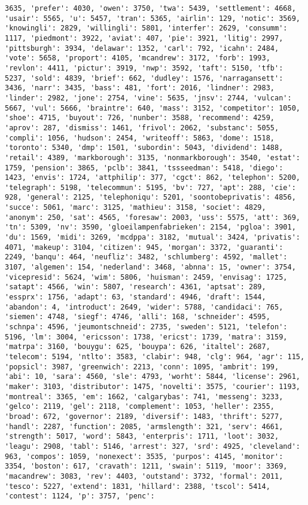 \documentclass[11pt]{article}
\begin{document}
\begin{Verbatim}[commandchars=\\\{\}]
3635, 'prefer': 4030, 'owen': 3750, 'twa': 5439, 'settlement': 4668, 'usair': 5565, 'u': 5457, 'tran': 5365, 'airlin': 129, 'notic': 3569, 'knowingli': 2829, 'willingli': 5801, 'interfer': 2629, 'consumm': 1117, 'piedmont': 3922, 'aviat': 407, 'pie': 3921, 'litig': 2997, 'pittsburgh': 3934, 'delawar': 1352, 'carl': 792, 'icahn': 2484, 'vote': 5658, 'proport': 4105, 'mcandrew': 3172, 'forb': 1993, 'revlon': 4411, 'pictur': 3919, 'nwp': 3592, 'taft': 5150, 'tfb': 5237, 'sold': 4839, 'brief': 662, 'dudley': 1576, 'narragansett': 3436, 'narr': 3435, 'bass': 481, 'fort': 2016, 'lindner': 2983, 'linder': 2982, 'jone': 2754, 'vine': 5635, 'jnsv': 2744, 'vulcan': 5667, 'vul': 5666, 'braintre': 640, 'mass': 3152, 'competitor': 1050, 'shoe': 4715, 'buyout': 726, 'nunber': 3588, 'recommend': 4259, 'aprov': 287, 'dismiss': 1461, 'frivol': 2062, 'substanc': 5055, 'compli': 1056, 'hudson': 2454, 'writeoff': 5863, 'dome': 1518, 'toronto': 5340, 'dmp': 1501, 'subordin': 5043, 'dividend': 1488, 'retail': 4389, 'markborough': 3135, 'nonmarkborough': 3540, 'estat': 1759, 'pension': 3865, 'pclb': 3841, 'tssseedman': 5418, 'diego': 1423, 'envis': 1724, 'attphilip': 377, 'cgct': 862, 'telephon': 5200, 'telegraph': 5198, 'telecommun': 5195, 'bv': 727, 'apt': 288, 'cie': 928, 'general': 2125, 'telephoniqu': 5201, 'soontobeprivatis': 4856, 'succe': 5061, 'marc': 3125, 'mathieu': 3158, 'societ': 4829, 'anonym': 250, 'sat': 4565, 'foresaw': 2003, 'uss': 5575, 'att': 369, 'tn': 5309, 'nv': 3590, 'gloeilampenfabrieken': 2154, 'pgloa': 3901, 'du': 1569, 'midi': 3269, 'mcdppa': 3182, 'mutual': 3424, 'privatis': 4071, 'makeup': 3104, 'citizen': 945, 'morgan': 3372, 'guaranti': 2249, 'banqu': 464, 'neufliz': 3482, 'schlumberg': 4592, 'mallet': 3107, 'algemen': 154, 'nederland': 3468, 'abnna': 15, 'owner': 3754, 'vicepresid': 5624, 'wim': 5806, 'huisman': 2459, 'envisag': 1725, 'satapt': 4566, 'win': 5807, 'research': 4361, 'aptsat': 289, 'essprx': 1756, 'adapt': 63, 'standard': 4946, 'draft': 1544, 'abandon': 4, 'introduct': 2649, 'wider': 5788, 'candidaci': 765, 'siemen': 4748, 'siegf': 4746, 'alli': 168, 'schneider': 4595, 'schnpa': 4596, 'jeumontschneid': 2735, 'sweden': 5121, 'telefon': 5196, 'lm': 3004, 'ericsson': 1738, 'ericst': 1739, 'matra': 3159, 'matrpa': 3160, 'bouygu': 625, 'bouypa': 626, 'italtel': 2687, 'telecom': 5194, 'ntlto': 3583, 'clabir': 948, 'clg': 964, 'agr': 115, 'popsicl': 3987, 'greenwich': 2213, 'conn': 1095, 'ambrit': 199, 'abi': 10, 'sara': 4560, 'sle': 4793, 'worht': 5844, 'license': 2961, 'maker': 3103, 'distributor': 1475, 'novelti': 3575, 'courier': 1193, 'montreal': 3365, 'em': 1662, 'calgarybas': 741, 'messeng': 3233, 'gelco': 2119, 'gel': 2118, 'complement': 1053, 'heller': 2355, 'broad': 672, 'governor': 2189, 'diversif': 1483, 'thrift': 5277, 'handl': 2287, 'function': 2085, 'armslength': 321, 'serv': 4661, 'strength': 5017, 'word': 5843, 'enterpris': 1711, 'loot': 3032, 'leagu': 2908, 'tabl': 5146, 'arrest': 327, 'srd': 4925, 'cleveland': 963, 'compos': 1059, 'nonexect': 3535, 'purpos': 4145, 'monitor': 3354, 'boston': 617, 'cravath': 1211, 'swain': 5119, 'moor': 3369, 'macandrew': 3083, 'rev': 4403, 'outstand': 3732, 'formal': 2011, 'tesco': 5227, 'extend': 1831, 'hillard': 2388, 'tscol': 5414, 'contest': 1124, 'p': 3757, 'penc': 
\end{Verbatim}
\end{document}
